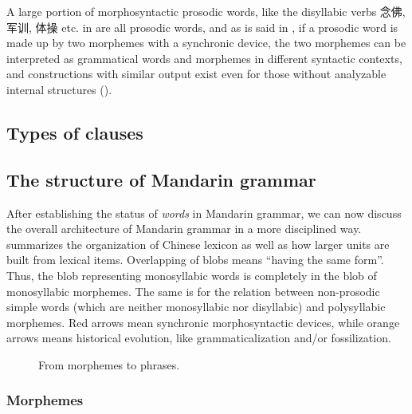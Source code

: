 \documentclass[UTF8, a4paper, oneside, scheme=plain]{ctexrep}
\newcommand*{\term}[1]{\emph{#1}}
\begin{document}
A large portion of morphosyntactic prosodic words,
like the disyllabic verbs 念佛, 军训, 体操 etc. 
in  
are all prosodic words,
and as is said in ,
if a prosodic word is made up by two morphemes with a synchronic device,
the two morphemes can be interpreted as grammatical words and morphemes in different syntactic contexts,
and constructions with similar output 
exist even for those without analyzable internal structures 
().

\subsection{Types of clauses}

\subsection{The structure of Mandarin grammar}

After establishing the status of \term{words} in Mandarin grammar, 
we can now discuss the overall architecture of Mandarin grammar 
in a more disciplined way.
 summarizes the organization of Chinese lexicon 
as well as how larger units are built from lexical items.
Overlapping of blobs means ``having the same form''.
Thus, the blob representing monosyllabic words is completely in the blob of monosyllabic morphemes.
The same is for the relation between non-prosodic simple words 
(which are neither monosyllabic nor disyllabic) and polysyllabic morphemes.
Red arrows mean synchronic morphosyntactic devices,
while orange arrows means historical evolution,
like grammaticalization and/or fossilization.

\begin{figure}[H]
    \centering
    
    \caption{From morphemes to phrases.}
    \label{fig:morpheme-to-phrase}
\end{figure}

\subsubsection{Morphemes}
\end{document}
